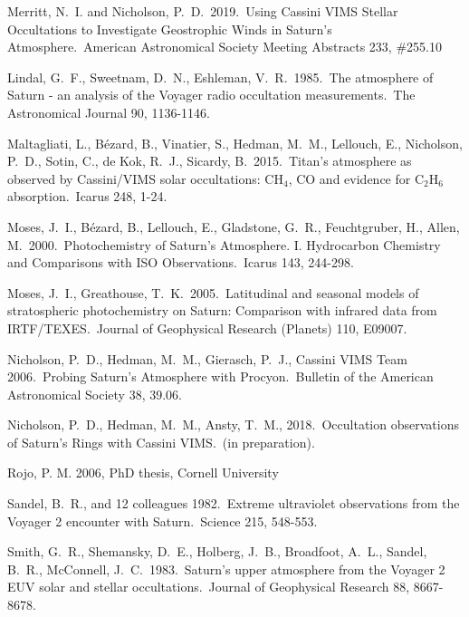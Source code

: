 \documentclass[preprint]{aastex}
\begin{document}
\begin{thebibliography}{28}
 {Merritt}, N.~I. and {Nicholson},
P.~D.\ 2019.\ Using Cassini VIMS Stellar Occultations to Investigate
Geostrophic Winds in Saturn's Atmosphere.\ American Astronomical Society
Meeting Abstracts 233, \#255.10

 Lindal, G.~F., Sweetnam, D.~N., 
Eshleman, V.~R.\ 1985.\ The atmosphere of Saturn - an analysis of the Voyager 
radio occultation measurements.\ The Astronomical Journal 90, 1136-1146.

 Maltagliati, L., B{\'e}zard, B., 
Vinatier, S., Hedman, M.~M., Lellouch, E., Nicholson, P.~D., Sotin, C., 
de Kok, R.~J., Sicardy, B.\ 2015.\ Titan's atmosphere as observed by 
Cassini/VIMS solar occultations: CH$_{4}$, CO and evidence for C$_{2}$H$_{6}$ 
absorption.\ Icarus 248, 1-24. 

 Moses, J.~I., B{\'e}zard, B., Lellouch, E., 
Gladstone, G.~R., Feuchtgruber, H., Allen, M.\ 2000.\ Photochemistry of 
Saturn's Atmosphere. I. Hydrocarbon Chemistry and Comparisons with ISO 
Observations.\ Icarus 143, 244-298. 

 Moses, J.~I., Greathouse, T.~K.\ 
2005.\ Latitudinal and seasonal models of stratospheric photochemistry on 
Saturn: Comparison with infrared data from IRTF/TEXES.\ Journal of 
Geophysical Research (Planets) 110, E09007. 

 Nicholson, P.~D., Hedman, 
M.~M., Gierasch, P.~J., Cassini VIMS Team 2006.\ Probing Saturn's Atmosphere 
with Procyon.\ Bulletin of the American Astronomical Society 38, 39.06. 

 Nicholson, P.~D., Hedman, 
M.~M., Ansty, T.~M., 2018.\ Occultation observations of Saturn's Rings with Cassini 
VIMS.\ (in preparation). 

 Rojo, P. M. 2006, PhD thesis, Cornell University

 Sandel, B.~R., and 12 colleagues 1982.\ 
Extreme ultraviolet observations from the Voyager 2 encounter with Saturn.\ 
Science 215, 548-553. 

\bibitem[Smith et al.(1983)]{Smith83} Smith, G.~R., Shemansky, D.~E., 
Holberg, J.~B., Broadfoot, A.~L., Sandel, B.~R., McConnell, J.~C.\ 
1983.\ Saturn's upper atmosphere from the Voyager 2 EUV solar and 
stellar occultations.\ Journal of Geophysical Research 88, 8667-8678. 


\end{thebibliography}
\end{document}
